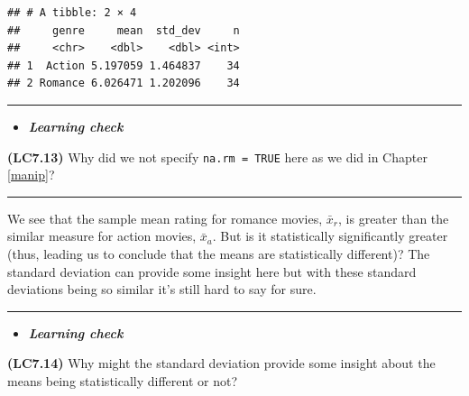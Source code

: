 \documentclass[]{tufte-book}
\newenvironment{Shaded}{\begin{snugshade}}{\end{snugshade}}
\newcommand{\KeywordTok}[1]{\textcolor[rgb]{0.13,0.29,0.53}{\textbf{{#1}}}}
\newcommand{\DataTypeTok}[1]{\textcolor[rgb]{0.13,0.29,0.53}{{#1}}}
\newcommand{\StringTok}[1]{\textcolor[rgb]{0.31,0.60,0.02}{{#1}}}
\newcommand{\NormalTok}[1]{{#1}}
\let\oldrule=\rule
\renewcommand{\rule}[1]{\oldrule{\linewidth}}
\newenvironment{rmdblock}[1]
  {\begin{shaded*}
  \begin{itemize}
  \renewcommand{\labelitemi}{
    \raisebox{-.7\height}[0pt][0pt]{
    }
  }
  \item
  }
  {
  \end{itemize}
  \end{shaded*}
  }
\newenvironment{learncheck}
  {\begin{rmdblock}{warning}}
  {\end{rmdblock}}
\begin{document}
\begin{Shaded}
\end{Shaded}

\begin{verbatim}
## # A tibble: 2 × 4
##     genre     mean  std_dev     n
##     <chr>    <dbl>    <dbl> <int>
## 1  Action 5.197059 1.464837    34
## 2 Romance 6.026471 1.202096    34
\end{verbatim}

\begin{center}\rule{0.5\linewidth}{\linethickness}\end{center}

\begin{learncheck}
\textbf{\emph{Learning check}}
\end{learncheck}

\textbf{(LC7.13)} Why did we not specify \texttt{na.rm\ =\ TRUE} here as
we did in Chapter \ref{manip}?

\begin{center}\rule{0.5\linewidth}{\linethickness}\end{center}

We see that the sample mean rating for romance movies, \(\bar{x}_{r}\),
is greater than the similar measure for action movies, \(\bar{x}_a\).
But is it statistically significantly greater (thus, leading us to
conclude that the means are statistically different)? The standard
deviation can provide some insight here but with these standard
deviations being so similar it's still hard to say for sure.

\begin{center}\rule{0.5\linewidth}{\linethickness}\end{center}

\begin{learncheck}
\textbf{\emph{Learning check}}
\end{learncheck}

\textbf{(LC7.14)} Why might the standard deviation provide some insight
about the means being statistically different or not?
\end{document}
